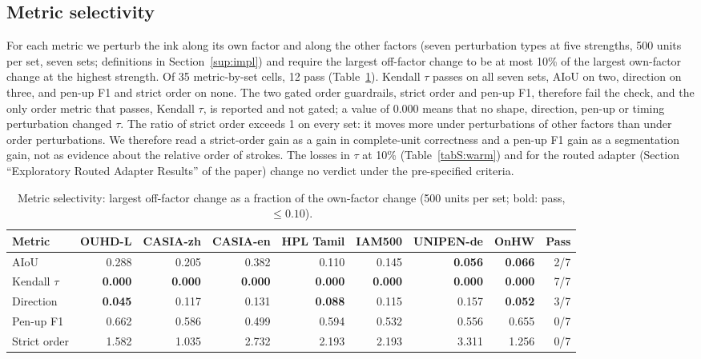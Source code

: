 \documentclass[10pt,a4paper]{article}
\newcommand{\botrule}{\bottomrule}
\newcommand{\ext}[1]{\par\noindent{\small\itshape Extends in the paper: #1.}\par\smallskip}
\begin{document}
\subsection{Metric selectivity}\label{sup:m1res}
\ext{Discussion}
For each metric we perturb the ink along its own factor and along the other factors (seven perturbation types at five strengths, 500 units per set, seven sets; definitions in Section~\ref{sup:impl}) and require the largest off-factor change to be at most 10\% of the largest own-factor change at the highest strength. Of 35 metric-by-set cells, 12 pass (Table~\ref{tabS:m1}). Kendall $\tau$ passes on all seven sets, AIoU on two, direction on three, and pen-up F1 and strict order on none. The two gated order guardrails, strict order and pen-up F1, therefore fail the check, and the only order metric that passes, Kendall $\tau$, is reported and not gated; a value of 0.000 means that no shape, direction, pen-up or timing perturbation changed $\tau$. The ratio of strict order exceeds 1 on every set: it moves more under perturbations of other factors than under order perturbations. We therefore read a strict-order gain as a gain in complete-unit correctness and a pen-up F1 gain as a segmentation gain, not as evidence about the relative order of strokes. The losses in $\tau$ at 10\% (Table~\ref{tabS:warm}) and for the routed adapter (Section ``Exploratory Routed Adapter Results'' of the paper) change no verdict under the pre-specified criteria.

\begin{table}[!htbp]
\centering
\caption{Metric selectivity: largest off-factor change as a fraction of the own-factor change (500 units per set; bold: pass, $\le 0.10$).}\label{tabS:m1}
\scriptsize\setlength{\tabcolsep}{3pt}
\begin{tabular}{@{}lrrrrrrrr@{}}
\toprule
Metric & OUHD-L & CASIA-zh & CASIA-en & HPL Tamil & IAM500 & UNIPEN-de & OnHW & Pass\\
\midrule
AIoU & 0.288 & 0.205 & 0.382 & 0.110 & 0.145 & \textbf{0.056} & \textbf{0.066} & 2/7\\
Kendall $\tau$ & \textbf{0.000} & \textbf{0.000} & \textbf{0.000} & \textbf{0.000} & \textbf{0.000} & \textbf{0.000} & \textbf{0.000} & 7/7\\
Direction & \textbf{0.045} & 0.117 & 0.131 & \textbf{0.088} & 0.115 & 0.157 & \textbf{0.052} & 3/7\\
Pen-up F1 & 0.662 & 0.586 & 0.499 & 0.594 & 0.532 & 0.556 & 0.655 & 0/7\\
Strict order & 1.582 & 1.035 & 2.732 & 2.193 & 2.193 & 3.311 & 1.256 & 0/7\\
\botrule
\end{tabular}
\end{table}
\FloatBarrier
\end{document}
